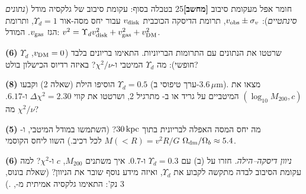 \documentclass[11pt,a4paper]{article}
\begin{document}
\begin{question}{חומר אפל מעקומת סיבוב \textbf{[מחשב]}}{25}
בטבלה בסוף: עקומת סיבוב של גלקסיה מודל (\emph{נתונים סינתטיים}): $v_{\rm obs}\pm\sigma_v$, תרומת הדיסקה הכוכבית $v_{\rm disk}$ עבור יחס מסה-אור $\Upsilon_d=1$, ותרומת הגז $v_{\rm gas}$. המודל: $v^2=\Upsilon_dv_{\rm disk}^2+v_{\rm gas}^2+v_{\rm DM}^2$.
\begin{parts}
\item \textbf{(6)} שרטטו את הנתונים עם התרומות הבריוניות. התאימו בריונים בלבד ($v_{\rm DM}=0$, $\Upsilon_d$ חופשי): מה $\Upsilon_d$ המיטבי ו-$\chi^2/\nu$? באיזה רדיוס הכישלון בולט?
\item \textbf{(8)} הוסיפו הילת  (שאלה 2) וקבעו $\Upsilon_d=0.5$ (ערך טיפוסי ב-$3.6\,\mu$m). מצאו את $(\log_{10}M_{200},c)$ המיטביים על גריד או ב- מתרגיל 2, ושרטטו את קווי $\Delta\chi^2=2.30$ ו-$6.17$. מה $\chi^2/\nu$?
\item \textbf{(5)} מה יחס המסה האפלה לבריונית בתוך $30\,\mathrm{kpc}$? (השתמשו במודל המיטבי, ו-$M(<R)=v^2R/G$ לכל רכיב.) השוו ליחס הקוסמי $\Omega_{\rm dm}/\Omega_b\approx5.4$.
\item \textbf{(6)} \emph{ניוון דיסקה--הילה.} חזרו על (ב) עם $\Upsilon_d=0.3$ ו-$0.7$. איך משתנים $M_{200}$, $c$ ו-$\chi^2$? למה עקומת הסיבוב לבדה מתקשה לקבוע את $\Upsilon_d$, ואיזה מידע נוסף שובר את הניוון? (שאלת בונוס, 3 נק': התאימו גלקסיה אמיתית מ-, .)
\end{parts}
\end{question}
\end{document}
